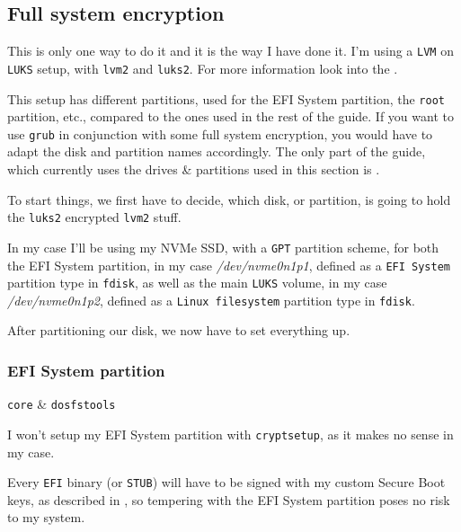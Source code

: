 \documentclass[10pt]{dustdoc}
\begin{document}
\subsection{Full system encryption}
\label{sec:full-system-encryption}

\begin{NOTE}
    This is only one way to do it and it is the way I have done it.
    I’m using a \texttt{LVM} on \texttt{LUKS} setup, with \texttt{lvm2} and \texttt{luks2}.
    For more information look into the .
\end{NOTE}

\begin{NOTE}
    This setup has different partitions, used for the EFI System partition, the \texttt{root} partition, etc., compared to the ones used in the rest of the guide.
    If you want to use \texttt{grub} in conjunction with some full system encryption, you would have to adapt the disk and partition names accordingly.
    The only part of the guide, which currently uses the drives \& partitions used in this section is .
\end{NOTE}

To start things, we first have to decide, which disk, or partition, is going to hold the \texttt{luks2} encrypted \texttt{lvm2} stuff.

In my case I’ll be using my NVMe SSD, with a \texttt{GPT} partition scheme, for both the EFI System partition, in my case \textit{/dev/nvme0n1p1}, defined as a \texttt{EFI System} partition type in \texttt{fdisk}, as well as the main \texttt{LUKS} volume, in my case \textit{/dev/nvme0n1p2}, defined as a \texttt{Linux filesystem} partition type in \texttt{fdisk}.

After partitioning our disk, we now have to set everything up.

\subsubsection{EFI System partition}
\label{sec:efi-system-partition}

\begin{packagetable}
    \texttt{core} & \texttt{dosfstools} \\
\end{packagetable}

I won’t setup my EFI System partition with \texttt{cryptsetup}, as it makes no sense in my case.

Every \texttt{EFI} binary (or \texttt{STUB}) will have to be signed with my custom Secure Boot keys, as described in , so tempering with the EFI System partition poses no risk to my system.
\end{document}
